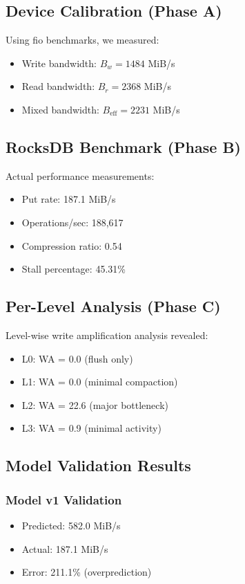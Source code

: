 \documentclass[11pt,twocolumn]{article}
\begin{document}
\subsection{Device Calibration (Phase A)}

Using fio benchmarks, we measured:
\begin{itemize}
    \item Write bandwidth: $B_w = 1484$ MiB/s
    \item Read bandwidth: $B_r = 2368$ MiB/s
    \item Mixed bandwidth: $B_{\text{eff}} = 2231$ MiB/s
\end{itemize}

\subsection{RocksDB Benchmark (Phase B)}

Actual performance measurements:
\begin{itemize}
    \item Put rate: 187.1 MiB/s
    \item Operations/sec: 188,617
    \item Compression ratio: 0.54
    \item Stall percentage: 45.31\%
\end{itemize}

\subsection{Per-Level Analysis (Phase C)}

Level-wise write amplification analysis revealed:
\begin{itemize}
    \item L0: WA = 0.0 (flush only)
    \item L1: WA = 0.0 (minimal compaction)
    \item L2: WA = 22.6 (major bottleneck)
    \item L3: WA = 0.9 (minimal activity)
\end{itemize}

\subsection{Model Validation Results}

\subsubsection{Model v1 Validation}
\begin{itemize}
    \item Predicted: 582.0 MiB/s
    \item Actual: 187.1 MiB/s
    \item Error: 211.1\% (overprediction)
\end{itemize}
\end{document}

